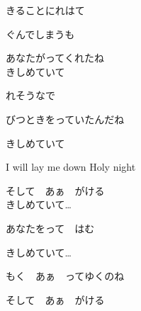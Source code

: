 {きることにれはて

ぐんでしまうも

あなたがってくれたね
\\

きしめていて

れそうなで

びつときをっていたんだね

きしめていて

I will lay me down Holy night

そして　あぁ　がける
\\

きしめていて…

あなたをって　はむ

きしめていて…

もく　あぁ　ってゆくのね

そして　あぁ　がける

}